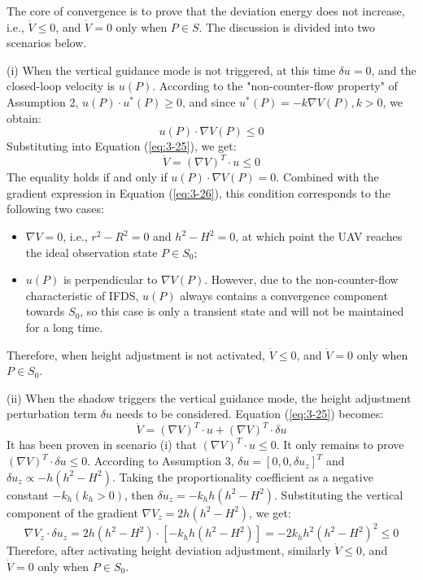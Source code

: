 \documentclass[final,3p,times,numbers]{elsarticle}
\begin{document}
The core of convergence is to prove that the deviation energy does not increase, i.e., $\dot{V} \le 0$, and $\dot{V}=0$ only when $P \in S$. The discussion is divided into two scenarios below.

(i) When the vertical guidance mode is not triggered, at this time $\delta u = 0$, and the closed-loop velocity is $u(P)$. According to the "non-counter-flow property" of Assumption 2, $u(P) \cdot u^*(P) \ge 0$, and since $u^*(P) = -k \nabla V(P), k>0$, we obtain:
\begin{equation}
u(P) \cdot \nabla V(P) \le 0 \label{eq:3-27}
\end{equation}
Substituting into Equation (\ref{eq:3-25}), we get:
\begin{equation}
\dot{V} = (\nabla V)^T \cdot u \le 0 \label{eq:3-28}
\end{equation}
The equality holds if and only if $u(P) \cdot \nabla V(P) = 0$. Combined with the gradient expression in Equation (\ref{eq:3-26}), this condition corresponds to the following two cases:
\begin{itemize}
    \item $\nabla V = 0$, i.e., $r^2 - R^2 = 0$ and $h^2 - H^2 = 0$, at which point the UAV reaches the ideal observation state $P \in S_0$;
    \item $u(P)$ is perpendicular to $\nabla V(P)$. However, due to the non-counter-flow characteristic of IFDS, $u(P)$ always contains a convergence component towards $S_0$, so this case is only a transient state and will not be maintained for a long time.
\end{itemize}
Therefore, when height adjustment is not activated, $\dot{V} \le 0$, and $\dot{V}=0$ only when $P \in S_0$.

(ii) When the shadow triggers the vertical guidance mode, the height adjustment perturbation term $\delta u$ needs to be considered. Equation (\ref{eq:3-25}) becomes:
\begin{equation}
\dot{V} = (\nabla V)^T \cdot u + (\nabla V)^T \cdot \delta u \label{eq:3-29}
\end{equation}
It has been proven in scenario (i) that $(\nabla V)^T \cdot u \le 0$. It only remains to prove $(\nabla V)^T \cdot \delta u \le 0$. According to Assumption 3, $\delta u = [0, 0, \delta u_z]^T$ and $\delta u_z \propto -h(h^2 - H^2)$. Taking the proportionality coefficient as a negative constant $-k_h (k_h > 0)$, then $\delta u_z = -k_h h(h^2 - H^2)$. Substituting the vertical component of the gradient $\nabla V_z = 2h(h^2 - H^2)$, we get:
\begin{equation}
\nabla V_z \cdot \delta u_z = 2h(h^2 - H^2) \cdot [-k_h h(h^2 - H^2)] = -2k_h h^2(h^2 - H^2)^2 \le 0 \label{eq:3-30}
\end{equation}
Therefore, after activating height deviation adjustment, similarly $\dot{V} \le 0$, and $\dot{V}=0$ only when $P \in S_0$.
\end{document}
